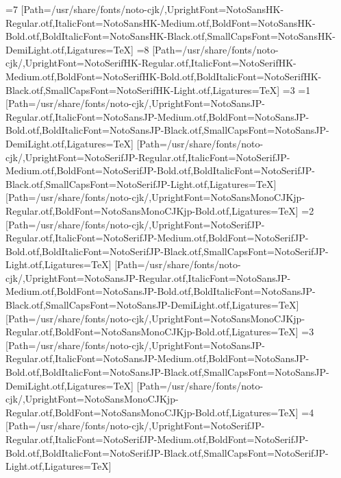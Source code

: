 \else\ifnum\value{CJKFonts}=7
[Path=/usr/share/fonts/noto-cjk/,UprightFont=NotoSansHK-Regular.otf,ItalicFont=NotoSansHK-Medium.otf,BoldFont=NotoSansHK-Bold.otf,BoldItalicFont=NotoSansHK-Black.otf,SmallCapsFont=NotoSansHK-DemiLight.otf,Ligatures=TeX]
\else\ifnum\value{CJKFonts}=8
[Path=/usr/share/fonts/noto-cjk/,UprightFont=NotoSerifHK-Regular.otf,ItalicFont=NotoSerifHK-Medium.otf,BoldFont=NotoSerifHK-Bold.otf,BoldItalicFont=NotoSerifHK-Black.otf,SmallCapsFont=NotoSerifHK-Light.otf,Ligatures=TeX]
\fi\fi\fi\fi\fi\fi\fi\fi\else
\ifnum\value{CJKLanguage}=3
\ifnum\value{CJKFonts}=1
[Path=/usr/share/fonts/noto-cjk/,UprightFont=NotoSansJP-Regular.otf,ItalicFont=NotoSansJP-Medium.otf,BoldFont=NotoSansJP-Bold.otf,BoldItalicFont=NotoSansJP-Black.otf,SmallCapsFont=NotoSansJP-DemiLight.otf,Ligatures=TeX]
[Path=/usr/share/fonts/noto-cjk/,UprightFont=NotoSerifJP-Regular.otf,ItalicFont=NotoSerifJP-Medium.otf,BoldFont=NotoSerifJP-Bold.otf,BoldItalicFont=NotoSerifJP-Black.otf,SmallCapsFont=NotoSerifJP-Light.otf,Ligatures=TeX]
[Path=/usr/share/fonts/noto-cjk/,UprightFont=NotoSansMonoCJKjp-Regular.otf,BoldFont=NotoSansMonoCJKjp-Bold.otf,Ligatures=TeX]
\else\ifnum\value{CJKFonts}=2
[Path=/usr/share/fonts/noto-cjk/,UprightFont=NotoSerifJP-Regular.otf,ItalicFont=NotoSerifJP-Medium.otf,BoldFont=NotoSerifJP-Bold.otf,BoldItalicFont=NotoSerifJP-Black.otf,SmallCapsFont=NotoSerifJP-Light.otf,Ligatures=TeX]
[Path=/usr/share/fonts/noto-cjk/,UprightFont=NotoSansJP-Regular.otf,ItalicFont=NotoSansJP-Medium.otf,BoldFont=NotoSansJP-Bold.otf,BoldItalicFont=NotoSansJP-Black.otf,SmallCapsFont=NotoSansJP-DemiLight.otf,Ligatures=TeX]
[Path=/usr/share/fonts/noto-cjk/,UprightFont=NotoSansMonoCJKjp-Regular.otf,BoldFont=NotoSansMonoCJKjp-Bold.otf,Ligatures=TeX]
\else\ifnum\value{CJKFonts}=3
[Path=/usr/share/fonts/noto-cjk/,UprightFont=NotoSansJP-Regular.otf,ItalicFont=NotoSansJP-Medium.otf,BoldFont=NotoSansJP-Bold.otf,BoldItalicFont=NotoSansJP-Black.otf,SmallCapsFont=NotoSansJP-DemiLight.otf,Ligatures=TeX]
[Path=/usr/share/fonts/noto-cjk/,UprightFont=NotoSansMonoCJKjp-Regular.otf,BoldFont=NotoSansMonoCJKjp-Bold.otf,Ligatures=TeX]
\else\ifnum\value{CJKFonts}=4
[Path=/usr/share/fonts/noto-cjk/,UprightFont=NotoSerifJP-Regular.otf,ItalicFont=NotoSerifJP-Medium.otf,BoldFont=NotoSerifJP-Bold.otf,BoldItalicFont=NotoSerifJP-Black.otf,SmallCapsFont=NotoSerifJP-Light.otf,Ligatures=TeX]
